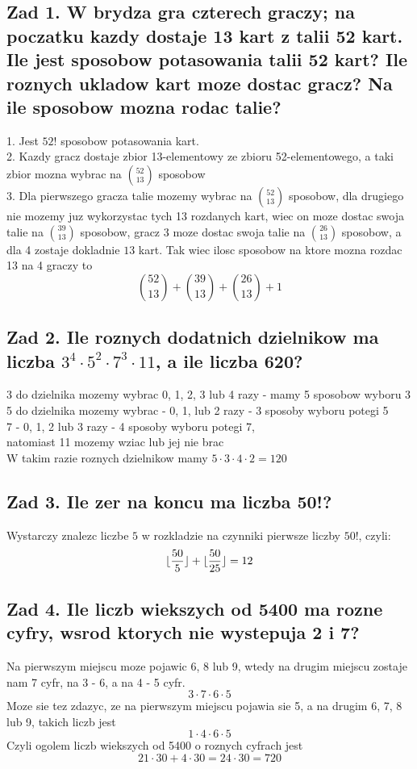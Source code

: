 \documentclass{article}
\begin{document}
\ttfamily
\subsection*{Zad 1. W brydza gra czterech graczy; na poczatku kazdy dostaje 13 kart z talii 52 kart.\\
Ile jest sposobow potasowania talii 52 kart? Ile roznych ukladow kart moze dostac gracz? Na ile sposobow mozna rodac talie?}
    1. Jest $52!$ sposobow potasowania kart.\bigskip\\
    2. Kazdy gracz dostaje zbior 13-elementowy ze zbioru 52-elementowego, a taki zbior mozna wybrac na ${52\choose13}$ sposobow\bigskip\\
    3. Dla pierwszego gracza talie mozemy wybrac na ${52\choose 13}$ sposobow, dla drugiego nie mozemy juz wykorzystac tych 13 rozdanych kart, wiec on moze dostac swoja talie na ${39\choose13}$ sposobow, gracz 3 moze dostac swoja talie na $26\choose 13$ sposobow, a dla 4 zostaje dokladnie $13$ kart. Tak wiec ilosc sposobow na ktore mozna rozdac 13 na 4 graczy to
        $${52\choose13}+{39\choose13}+{26\choose13}+1$$
\subsection*{Zad 2. Ile roznych dodatnich dzielnikow ma liczba $3^4\cdot5^2\cdot7^3\cdot11$, a ile liczba 620?}
    3 do dzielnika mozemy wybrac 0, 1, 2, 3 lub 4 razy - mamy 5 sposobow wyboru 3\smallskip\\
    5 do dzielnika mozemy wybrac - 0, 1, lub 2 razy - 3 sposoby wyboru potegi 5\smallskip\\
    7 - 0, 1, 2 lub 3 razy - 4 sposoby wyboru potegi 7,\smallskip\\
    natomiast 11 mozemy wziac lub jej nie brac\medskip\\
    W takim razie roznych dzielnikow mamy $5\cdot3\cdot4\cdot2=120$
\subsection*{Zad 3. Ile zer na koncu ma liczba 50!?}
    Wystarczy znalezc liczbe $5$ w rozkladzie na czynniki pierwsze liczby $50!$, czyli:
    $$\lfloor{50\over5}\rfloor + \lfloor{50\over25}\rfloor=12$$
\subsection*{Zad 4. Ile liczb wiekszych od 5400 ma rozne cyfry, wsrod ktorych nie wystepuja 2 i 7?}
    Na pierwszym miejscu moze pojawic 6, 8 lub 9, wtedy na drugim miejscu zostaje nam 7 cyfr, na 3 - 6, a na 4 - 5 cyfr.
    $$3\cdot7\cdot6\cdot5$$
    Moze sie tez zdazyc, ze na pierwszym miejscu pojawia sie 5, a na drugim 6, 7, 8 lub 9, takich liczb jest
    $$1\cdot4\cdot6\cdot5$$
    Czyli ogolem liczb wiekszych od 5400 o roznych cyfrach jest
    $$21\cdot30+4\cdot30=24\cdot30=720$$
\end{document}
